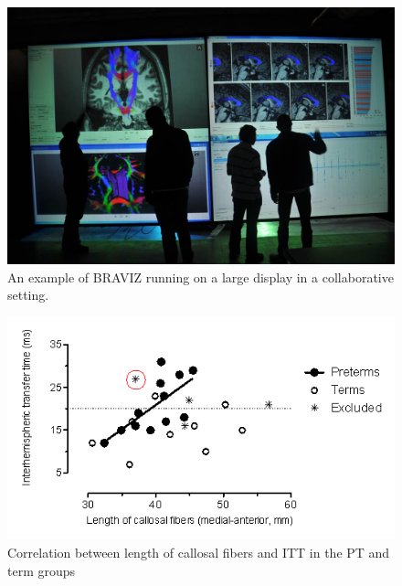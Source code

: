 \documentclass{frontiersHLTH}
\begin{document}
\begin{figure}
\begin{center}
\includegraphics[width=\linewidth]{imagine.jpg}
\end{center}
 \caption{\label{fig_imagine} An example of BRAVIZ running on a large display in a collaborative setting.}
\end{figure}


\begin{figure}
	\centering
		\includegraphics[width=\linewidth]{cyril_plot}
	\caption{Correlation between length of callosal fibers and ITT in the PT and term groups}
	\label{fig_cyril_1}
\end{figure}
\end{document}
